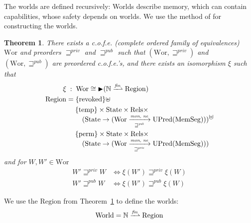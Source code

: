 \documentclass[compsoc,conference,letterpaper,fleqn]{IEEEtran}
\newtheorem{theorem}{Theorem}
\newcommand{\finparfun}{\xrightharpoonup{\textit{\tiny{fin}}}}
\newcommand{\fun}{\rightarrow}
\newcommand{\blater}{\mathop{\blacktriangleright}}
\newcommand{\cofe}{c.o.f.e.}
\newcommand{\cofes}{\cofe{}'s}
\newcommand\lau[1]{{\color{purple} \sf \footnotesize {LS: #1}}\\}
\newcommand\dominique[1]{{\color{purple} \sf \footnotesize {DD: #1}}\\}
\newcommand{\var}[1]{\mathit{#1}}
\newcommand{\futurewk}{\mathbin{\sqsupseteq}^{\var{pub}}}
\newcommand{\futurestr}{\mathbin{\sqsupseteq}^{\var{priv}}}
\newcommand{\monwknefun}{\xrightarrow[\text{\tiny{$\futurewk$}}]{\textit{\tiny{mon, ne}}}}
\newcommand{\monstrnefun}{\xrightarrow[\text{\tiny{$\futurestr$}}]{\textit{\tiny{mon, ne}}}}
\newcommand{\plaindom}[1]{\mathrm{#1}}
\newcommand{\HeapSegments}{\plaindom{MemSeg}}
\newcommand{\nats}{\mathbb{N}}
\newcommand{\Rels}{\plaindom{Rels}}
\newcommand{\States}{\plaindom{State}}
\newcommand{\Regions}{\plaindom{Region}}
\newcommand{\Worlds}{\plaindom{World}}
\newcommand{\Wor}{\plaindom{Wor}}
\newcommand{\UPred}[1]{\plaindom{UPred}(#1)}
\newcommand{\plainview}[1]{\mathrm{#1}}
\newcommand{\perma}{\plainview{perm}}
\newcommand{\temp}{\plainview{temp}}
\newcommand{\revoked}{\plainview{revoked}}
\begin{document}
The worlds are defined recursively: Worlds describe memory, which can
contain capabilities, whose safety depends on worlds. We use the method of
\citet{Birkedal:2011:SKM:1926385.1926401} for constructing the worlds.

\begin{theorem}\label{thm:world-existence}
  There exists a \cofe{} (complete ordered family of equivalences) $\Wor$ and preorders $\futurestr$ and
  $\futurewk$ such that $(\Wor,\futurestr)$ and $(\Wor,\futurewk)$ are
  preordered \cofes{}, and there exists an isomorphism $\xi$ such that
  \begin{align*}
      \xi &\; : \; \Wor \cong \blater (\nats \finparfun \Regions) \\
      \Regions & = \{\revoked\} \uplus \\
                 &\;\quad \begin{multlined}
                     \{\temp\} \times \States \times \Rels \times \\
                     (\States \fun (\Wor \monwknefun \UPred{\HeapSegments}))
                   \end{multlined} \uplus \\
                 &\;\quad \begin{multlined}
                     \{\perma\} \times \States \times \Rels \times \\
                     (\States \fun (\Wor \monstrnefun \UPred{\HeapSegments}))
                   \end{multlined}
    \end{align*}
  and for $W, W' \in \Wor$
  \begin{align*}
    W' \futurestr W & \Leftrightarrow \xi(W') \futurestr \xi(W)   \\
    W' \futurewk W & \Leftrightarrow \xi(W') \futurewk \xi(W)
  \end{align*}
\end{theorem}
We use the $\Regions$ from Theorem~\ref{thm:world-existence} to define
the worlds:
\[
  \Worlds = \nats \finparfun \Regions
\]
\end{document}
